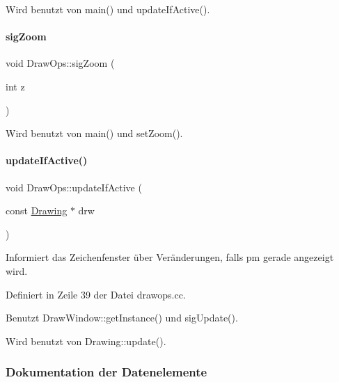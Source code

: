 Wird benutzt von main() und update\+If\+Active().

\mbox{\label{classDrawOps_a42489500245289165f927bcd9891c9bf}} 
\paragraph{\texorpdfstring{sig\+Zoom}{sigZoom}}
{\footnotesize\ttfamily void Draw\+Ops\+::sig\+Zoom (\begin{DoxyParamCaption}\item[{int}]{z }\end{DoxyParamCaption})\hspace{0.3cm}{\ttfamily [signal]}}



Wird benutzt von main() und set\+Zoom().

\mbox{\label{classDrawOps_aa0374dd23672c7313f0798172e5a3523}} 
\paragraph{\texorpdfstring{update\+If\+Active()}{updateIfActive()}}
{\footnotesize\ttfamily void Draw\+Ops\+::update\+If\+Active (\begin{DoxyParamCaption}\item[{const \mbox{\hyperlink{classDrawing}{Drawing}} $\ast$}]{drw }\end{DoxyParamCaption})}



Informiert das Zeichenfenster über Veränderungen, falls {\ttfamily pm} gerade angezeigt wird. 



Definiert in Zeile 39 der Datei drawops.\+cc.



Benutzt Draw\+Window\+::get\+Instance() und sig\+Update().



Wird benutzt von Drawing\+::update().



\subsubsection{Dokumentation der Datenelemente}
\mbox{\label{classDrawOps_adb69ea4ed5857e5f173064ad29018e6d}} 
